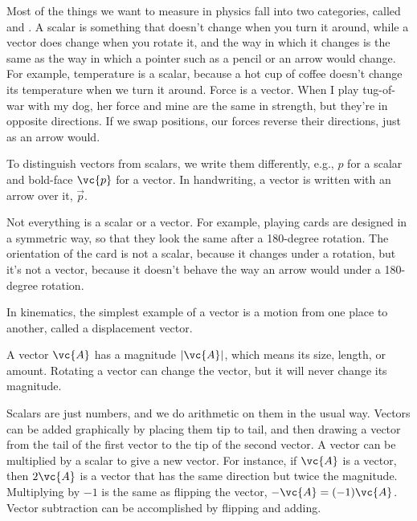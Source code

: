 Most of the things we want to measure in physics fall into two categories,
called  and .
A scalar is something
that doesn't change when you turn it around, while a vector does change
when you rotate it, and the way in which it changes is the same as the way
in which a pointer such as a pencil or an arrow would change. For example,
temperature is a scalar, because a hot cup of coffee doesn't change its temperature
when we turn it around. Force is a vector. When I play tug-of-war with my dog,
her force and mine are the same in strength, but they're in opposite directions.
If we swap positions, our forces reverse their directions, just as an arrow would.


To distinguish vectors from scalars, we write them differently, e.g., $p$ for a scalar
and bold-face $\vc{p}$ for a vector. In handwriting, a vector is written with an arrow
over it, $\overrightarrow{p}$.

Not everything is a scalar or a vector. For example, playing cards are designed
in a symmetric way, so that they look the same after a 180-degree rotation.
The orientation of the card is not a scalar, because it changes under a rotation,
but it's not a vector, because it doesn't behave the way an arrow would under a
180-degree rotation.

In kinematics, the simplest example of a vector is a motion from one place to another,
called a displacement vector.

A vector $\vc{A}$ has a magnitude $|\vc{A}|$, which means its size, length, or amount. Rotating a vector
can change the vector, but it will never change its magnitude.

Scalars are just numbers, and we do arithmetic on them in the usual
way.  Vectors can be added graphically by placing them tip to tail,
and then drawing a vector from the tail of the first vector to the tip
of the second vector. A vector can be multiplied by a scalar to give a new
vector. For instance, if $\vc{A}$ is a vector, then $2\vc{A}$ is a vector
that has the same direction but twice the magnitude. Multiplying by $-1$ is
the same as flipping the vector, $-\vc{A}=(-1)\vc{A}$. Vector subtraction can be
accomplished by flipping and adding.


